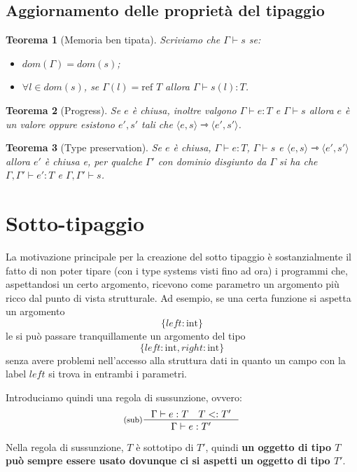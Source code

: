 \documentclass[a4paper, 11pt]{article}
\newtheorem{thm}{Teorema}[section]
\newcommand{\type}{\Gamma \vdash}
\newcommand{\goesto}{\rightarrowtriangle}
\begin{document}
\subsection{Aggiornamento delle proprietà del tipaggio}
\begin{thm}[Memoria ben tipata]
	Scriviamo che $\Gamma \vdash s$ se: \begin{itemize}
		\item $dom(\Gamma) = dom(s)$;
		\item $\forall l \in dom(s)$, se $\Gamma(l)=\text{ref }T$ allora $\Gamma \vdash s(l):T$.
	\end{itemize}
\end{thm}

\begin{thm}[Progress]
	Se $e$ è chiusa, inoltre valgono $\type e:T$ e $\type s$ allora $e$ è un valore oppure esistono $e',s'$ tali che $\langle e,s \rangle \goesto \langle e',s' \rangle$.
\end{thm}

\begin{thm}[Type preservation]
	Se $e$ è chiusa, $\type e:T$, $\type s$ e $\langle e,s \rangle \goesto \langle e',s' \rangle$ allora $e'$ è chiusa e, per qualche $\Gamma'$ con dominio disgiunto da $\Gamma$ si ha che $\Gamma, \Gamma' \vdash e':T$ e $\Gamma, \Gamma' \vdash s$.
\end{thm}

\newpage
\section{Sotto-tipaggio}
La motivazione principale per la creazione del sotto tipaggio è sostanzialmente il fatto di non poter tipare (con i type systems visti fino ad ora) i programmi che, aspettandosi un certo argomento, ricevono come parametro un argomento più ricco dal punto di vista strutturale. Ad esempio, se una certa funzione si aspetta un argomento 
\[
	\lbrace left: \text{int} \rbrace
\]
le si può passare tranquillamente un argomento del tipo \[ \lbrace left:\text{int}, right:\text{int} \rbrace \] senza avere problemi nell'accesso alla struttura dati in quanto un campo con la label $left$ si trova in entrambi i parametri.

Introduciamo quindi una regola di sussunzione, ovvero:
\[
	\inference[(sub)]{\type e:T \quad T<:T'}{\type e:T'}
\]

Nella regola di sussunzione, $T$ è sottotipo di $T'$, quindi \textbf{un oggetto di tipo $T$ può sempre essere usato dovunque ci si aspetti un oggetto di tipo $T'$}.
\end{document}
